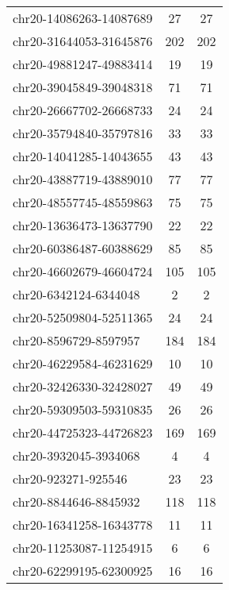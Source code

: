 \begin{longtable}{lSS}
	chr20-14086263-14087689 & 27     & 27                         \\
	chr20-31644053-31645876 & 202    & 202                        \\
	chr20-49881247-49883414 & 19     & 19                         \\
	chr20-39045849-39048318 & 71     & 71                         \\
	chr20-26667702-26668733 & 24     & 24                         \\
	chr20-35794840-35797816 & 33     & 33                         \\
	chr20-14041285-14043655 & 43     & 43                         \\
	chr20-43887719-43889010 & 77     & 77                         \\
	chr20-48557745-48559863 & 75     & 75                         \\
	chr20-13636473-13637790 & 22     & 22                         \\
	chr20-60386487-60388629 & 85     & 85                         \\
	chr20-46602679-46604724 & 105    & 105                        \\
	chr20-6342124-6344048   & 2      & 2                          \\
	chr20-52509804-52511365 & 24     & 24                         \\
	chr20-8596729-8597957   & 184    & 184                        \\
	chr20-46229584-46231629 & 10     & 10                         \\
	chr20-32426330-32428027 & 49     & 49                         \\
	chr20-59309503-59310835 & 26     & 26                         \\
	chr20-44725323-44726823 & 169    & 169                        \\
	chr20-3932045-3934068   & 4      & 4                          \\
	chr20-923271-925546     & 23     & 23                         \\
	chr20-8844646-8845932   & 118    & 118                        \\
	chr20-16341258-16343778 & 11     & 11                         \\
	chr20-11253087-11254915 & 6      & 6                          \\
	chr20-62299195-62300925 & 16     & 16                         \\

\end{longtable}

